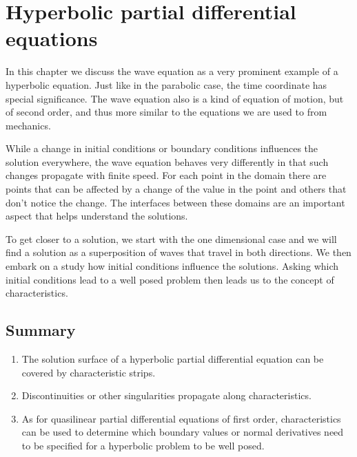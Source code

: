 %
%
%
\chapter{Hyperbolic partial differential equations
\label{chapter:hyperbolic}}
\rhead{}
In this chapter we discuss the wave equation as a very prominent
example of a hyperbolic equation.
Just like in the parabolic case, the time coordinate has special
significance.
The wave equation also is a kind of equation of motion, but of second
order, and thus more similar to the equations we are used to from
mechanics.

While a change in initial conditions or boundary conditions 
influences the solution everywhere, the wave equation behaves
very differently in that such changes propagate with finite speed.
For each point in the domain there are points that can be affected
by a change of the value in the point and others that don't notice
the change.
The interfaces between these domains are an important aspect that
helps understand the solutions.

To get closer to a solution, we start with the one dimensional case
and we will find a solution as a superposition of waves that travel in
both directions.
We then embark on a study how initial conditions influence the solutions.
Asking which initial conditions lead to a well posed problem then
leads us to the concept of characteristics.









\section{Summary}
\begin{enumerate}
\item
The solution surface of a hyperbolic partial differential equation can be
covered by characteristic strips.
\item
Discontinuities or other singularities propagate along characteristics.
\item
As for quasilinear partial differential equations of first order,
characteristics can be used to determine which boundary values or
normal derivatives need to be specified for a hyperbolic problem to
be well posed.
\end{enumerate}

